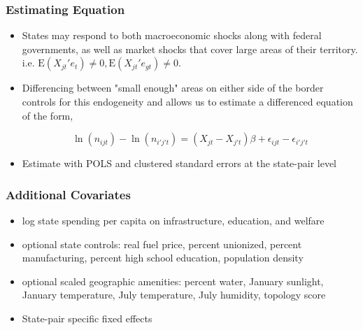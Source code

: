 \documentclass{beamer}
\begin{document}
\begin{frame}
\frametitle{Estimating Equation}
\begin{itemize}
\item States may respond to both macroeconomic shocks along with federal governments, as well as market shocks that cover large areas of their territory. i.e. $\mathrm{E}(X_{jt}'e_{t}) \neq 0, \mathrm{E}(X_{jt}'e_{gt}) \neq 0$.
\item Differencing between "small enough" areas on either side of the border controls for this endogeneity and allows us to estimate a differenced equation of the form,

$$\ln(n_{ijt})-\ln(n_{i'j't}) = (X_{jt}-X_{j't})\beta + \epsilon_{ijt}-\epsilon_{i'j't}$$

\item Estimate with POLS and clustered standard errors at the state-pair level
\end{itemize}
\end{frame}

\begin{frame}
\frametitle{Additional Covariates}

\begin{itemize}
\item log state spending per capita on infrastructure, education, and welfare
\item optional state controls: real fuel price, percent unionized, percent manufacturing, percent high school education, population density
\item optional scaled geographic amenities: percent water, January sunlight, January temperature, July temperature, July humidity, topology score
\item State-pair specific fixed effects
\end{itemize}
\end{frame}
\end{document}
